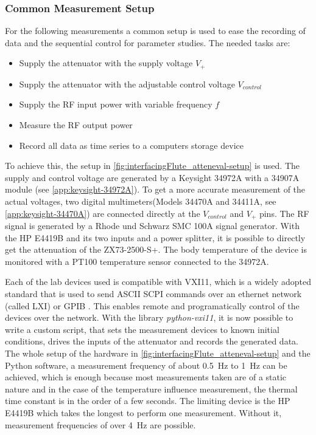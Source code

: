 \subsubsection{Common Measurement Setup}
For the following measurements a common setup is used to ease the recording of data and the sequential control for parameter studies. The needed tasks are:
\begin{itemize}
\item Supply the attenuator with the supply voltage $V_+$
\item Supply the attenuator with the adjustable control voltage $V_{control}$
\item Supply the RF input power with variable frequency $f$
\item Measure the RF output power
\item Record all data as time series to a computers storage device
\end{itemize}

To achieve this, the setup in \autoref{fig:interfacingFlute_atteneval-setup} is used.
The supply and control voltage are generated by a Keysight 34972A with a 34907A module (see \autoref{app:keysight-34972A}).
To get a more accurate measurement of the actual voltages, two digital multimeters(Models 34470A and 34411A, see \autoref{app:keysight-34470A}) are connected directly at the $V_{control}$ and $V_+$ pins.
The RF signal is generated by a Rhode und Schwarz SMC 100A signal generator.
With the HP E4419B and its two inputs and a power splitter, it is possible to directly get the attenuation of the ZX73-2500-S+.
The body temperature of the device is monitored with a PT100 temperature sensor connected to the 34972A.

Each of the lab devices used is compatible with VXI11, which is a widely adopted standard that is used to send ASCII SCPI commands over an ethernet network (called LXI) or GPIB \cite{lxi2021}.
This enables remote and programatically control of the devices over the network.
With the library \textit{python-vxi11}, it is now possible to write a custom script, that sets the measurement devices to known initial conditions, drives the inputs of the attenuator and records the generated data.
The whole setup of the hardware in \autoref{fig:interfacingFlute_atteneval-setup} and the Python software, a measurement frequency of about \SI{0.5}{\Hz} to \SI{1}{\Hz} can be achieved, which is enough because most measurements taken are of a static nature and in the case of the temperature influence measurement, the thermal time constant is in the order of a few seconds.
The limiting device is the HP E4419B which takes the longest to perform one measurement. Without it, measurement frequencies of over \SI{4}{\Hz} are possible.

